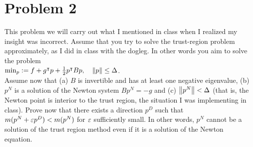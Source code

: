 \section{Problem 2}
This problem we will carry out what I mentioned in class when I realized my insight was incorrect. Assume that you try to solve the trust-region problem approximately, as I did in class with the dogleg. In other words you aim to solve the problem \\
$\min_{p} := f + g^\intercal p + \frac{1}{2}p^\intercal Bp, \quad \norm{p} \leq \Delta$.\\
Assume now that (a) $B$ is invertible and has at least one negative eigenvalue, (b) $p^N$ is a solution of the Newton system $Bp^N = -g$ and (c) $\norm{p^N} < \Delta$ (that is, the Newton point is interior to the trust region, the situation I was implementing in class). Prove now that there exists a direction $p^D$ such that $m(p^N + \varepsilon p^D) < m(p^N)$ for $\varepsilon$ sufficiently small. In other words, $p^N$ cannot be a solution of the trust region method even if it is a solution of the Newton equation.
\partbreak

